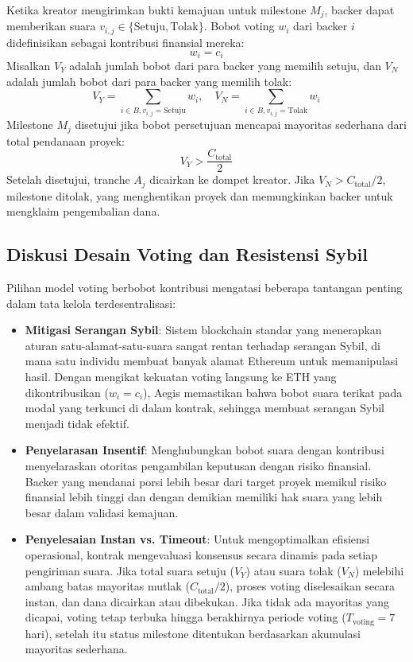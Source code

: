 \documentclass[conference]{IEEEtran}
\begin{document}
Ketika kreator mengirimkan bukti kemajuan untuk milestone $M_j$, backer dapat memberikan suara $v_{i,j} \in \{\text{Setuju}, \text{Tolak}\}$. Bobot voting $w_i$ dari backer $i$ didefinisikan sebagai kontribusi finansial mereka:
\begin{equation}
w_i = c_i
\end{equation}
Misalkan $V_Y$ adalah jumlah bobot dari para backer yang memilih setuju, dan $V_N$ adalah jumlah bobot dari para backer yang memilih tolak:
\begin{equation}
V_Y = \sum_{i \in B, v_{i,j} = \text{Setuju}} w_i, \quad V_N = \sum_{i \in B, v_{i,j} = \text{Tolak}} w_i
\end{equation}
Milestone $M_j$ disetujui jika bobot persetujuan mencapai mayoritas sederhana dari total pendanaan proyek:
\begin{equation}
V_Y > \frac{C_{\text{total}}}{2}
\end{equation}
Setelah disetujui, tranche $A_j$ dicairkan ke dompet kreator. Jika $V_N > C_{\text{total}}/2$, milestone ditolak, yang menghentikan proyek dan memungkinkan backer untuk mengklaim pengembalian dana.

\subsection{Diskusi Desain Voting dan Resistensi Sybil}
Pilihan model voting berbobot kontribusi mengatasi beberapa tantangan penting dalam tata kelola terdesentralisasi:
\begin{itemize}
	\item \textbf{Mitigasi Serangan Sybil}: Sistem blockchain standar yang menerapkan aturan satu-alamat-satu-suara sangat rentan terhadap serangan Sybil, di mana satu individu membuat banyak alamat Ethereum untuk memanipulasi hasil. Dengan mengikat kekuatan voting langsung ke ETH yang dikontribusikan ($w_i = c_i$), Aegis memastikan bahwa bobot suara terikat pada modal yang terkunci di dalam kontrak, sehingga membuat serangan Sybil menjadi tidak efektif.
	\item \textbf{Penyelarasan Insentif}: Menghubungkan bobot suara dengan kontribusi menyelaraskan otoritas pengambilan keputusan dengan risiko finansial. Backer yang mendanai porsi lebih besar dari target proyek memikul risiko finansial lebih tinggi dan dengan demikian memiliki hak suara yang lebih besar dalam validasi kemajuan.
	\item \textbf{Penyelesaian Instan vs. Timeout}: Untuk mengoptimalkan efisiensi operasional, kontrak mengevaluasi konsensus secara dinamis pada setiap pengiriman suara. Jika total suara setuju ($V_Y$) atau suara tolak ($V_N$) melebihi ambang batas mayoritas mutlak ($C_{\text{total}}/2$), proses voting diselesaikan secara instan, dan dana dicairkan atau dibekukan. Jika tidak ada mayoritas yang dicapai, voting tetap terbuka hingga berakhirnya periode voting ($T_{\text{voting}} = 7$ hari), setelah itu status milestone ditentukan berdasarkan akumulasi mayoritas sederhana.
\end{itemize}
\end{document}
